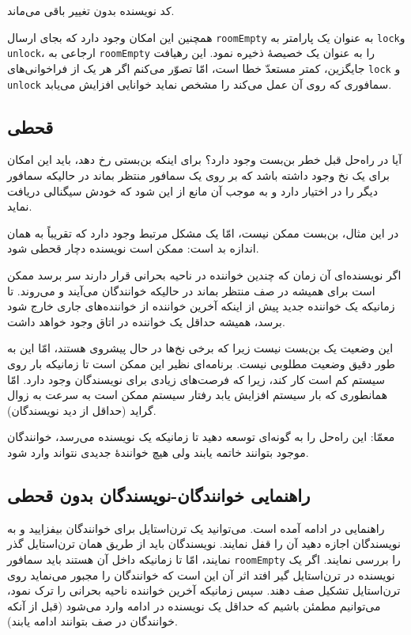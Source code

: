 \documentclass{book}
\newcommand{\clearemptydoublepage}{\newpage\cleardoublepage}
\begin{document}
    کد نویسنده بدون تغییر باقی می‌ماند. 

    همچنین این امکان وجود دارد که بجای ارسال {\tt roomEmpty} به عنوان یک پارامتر به {\tt lock}و  {\tt unlock}، 
    ارجاعی  به {\tt roomEmpty} را به عنوان یک خصیصهٔ‌  ذخیره نمود. این رهیافت جایگزین، کمتر مستعدّ خطا است،
    امّا تصوّر می‌کنم اگر هر یک از فراخوانی‌های {\tt lock} و  {\tt unlock} سمافوری که روی آن عمل می‌کند را مشخص نماید خوانایی افزایش می‌یابد. 
    
\subsection{قحطی}

    آیا در راه‌حل قبل خطر بن‌بست وجود دارد؟ 
    برای اینکه بن‌بستی رخ دهد، باید این امکان برای یک نخ وجود داشته باشد که بر  روی یک سمافور منتظر بماند در حالیکه سمافور دیگر را در اختیار دارد و 
    به موجب آن مانع از این شود که خودش سیگنالی دریافت نماید. 

    در این مثال، بن‌بست ممکن نیست، امّا یک مشکل مرتبط وجود دارد که تقریباً به همان اندازه بد است:‌ ممکن است نویسنده دچار قحطی شود. 

    اگر نویسنده‌ای آن زمان که چندین خواننده در ناحیه بحرانی قرار دارند سر برسد ممکن است برای همیشه در صف منتظر بماند در حالیکه خوانندگان 
    می‌آیند و می‌روند. تا زمانیکه یک خواننده جدید پیش از اینکه آخرین خواننده از خواننده‌های جاری خارج شود برسد، همیشه حداقل یک خواننده در اتاق 
    وجود خواهد داشت. 
    
    این وضعیت یک بن‌بست نیست زیرا که برخی نخ‌ها در حال پیشروی هستند، امّا این به طور دقیق وضعیت مطلوبی نیست. 
    برنامه‌ای نظیر این ممکن است تا زمانیکه بار روی سیستم کم است کار کند، زیرا که فرصت‌های زیادی برای نویسندگان وجود دارد. 
    امّا همانطوری که بار سیستم افزایش یابد رفتار سیستم ممکن است به سرعت به زوال گراید (حداقل از دید نویسندگان). 

    معمّا: این راه‌حل را به گونه‌ای توسعه دهید تا زمانیکه یک نویسنده می‌رسد، خوانندگان موجود بتوانند خاتمه یابند ولی هیچ خوانندهٔ جدیدی نتواند وارد شود. 


\clearemptydoublepage
\subsection {راهنمایی خوانندگان-نویسندگان بدون قحطی}  

    راهنمایی در ادامه آمده است. می‌توانید یک ترن‌استایل برای خوانندگان بیفزایید و به نویسندگان اجازه دهید آن را قفل نمایند. 
    نویسندگان باید از طریق همان ترن‌استایل گذر نمایند، امّا تا زمانیکه داخل آن هستند باید سمافور {\tt roomEmpty} را بررسی نمایند. 
    اگر یک نویسنده در ترن‌استایل گیر افتد اثر آن این است که خوانندگان را مجبور می‌نماید روی ترن‌استایل تشکیل صف دهند. سپس زمانیکه آخرین 
    خواننده ناحیه بحرانی را ترک نمود، می‌توانیم مطمئن باشیم که حداقل یک نویسنده در ادامه وارد می‌شود (قبل از آنکه خوانندگان در صف بتوانند ادامه یابند).
\end{document}
